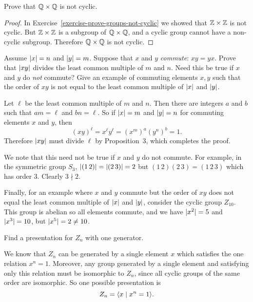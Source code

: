  Prove that $\mathbb{Q}\times\mathbb{Q}$ is not cyclic.
\begin{proof}
  In Exercise~\ref{exercise-prove-groups-not-cyclic} we showed that
  $\mathbb{Z}\times\mathbb{Z}$ is not cyclic. But $\mathbb{Z}\times\mathbb{Z}$ is a subgroup of
  $\mathbb{Q}\times\mathbb{Q}$, and a cyclic group cannot have a non-cyclic
  subgroup. Therefore $\mathbb{Q}\times\mathbb{Q}$ is not cyclic.
\end{proof}

 Assume $\lvert{x}\rvert = n$ and $\lvert{y}\rvert = m$. Suppose that $x$
and $y$ {\em commute}: $xy = yx$. Prove that $\lvert{xy}\rvert$ divides the
least common multiple of $m$ and $n$. Need this be true if $x$ and $y$
do {\em not} commute? Give an example of commuting elements $x,y$ such
that the order of $xy$ is not equal to the least common multiple of
$\lvert{x}\rvert$ and $\lvert{y}\rvert$.
\begin{solution}
  Let $\ell$ be the least common multiple of $m$ and $n$. Then there
  are integers $a$ and $b$ such that $am = \ell$ and $bn = \ell$. So
  if $\lvert{x}\rvert = m$ and $\lvert{y}\rvert = n$ for commuting elements $x$ and
  $y$, then
  \begin{equation*}
    (xy)^\ell = x^\ell y^\ell = (x^m)^a(y^n)^b = 1.
  \end{equation*}
  Therefore $\lvert{xy}\rvert$ must divide $\ell$ by Proposition~3, which
  completes the proof.

  We note that this need not be true if $x$ and $y$ do not
  commute. For example, in the symmetric group $S_3$,
  $\lvert{(1\,2)}\rvert = \lvert{(2\,3)}\rvert = 2$ but $(1\,2)(2\,3) = (1\,2\,3)$
  which has order $3$. Clearly $3\nmid2$.

  Finally, for an example where $x$ and $y$ commute but the order of
  $xy$ does not equal the least common multiple of $\lvert{x}\rvert$ and
  $\lvert{y}\rvert$, consider the cyclic group $Z_{10}$. This group is abelian
  so all elements commute, and we have $\lvert{x^2}\rvert = 5$ and
  $\lvert{x^3}\rvert = 10$, but $\lvert{x^5}\rvert = 2 \neq 10$.
\end{solution}

 Find a presentation for $Z_n$ with one generator.
\begin{solution}
  We know that $Z_n$ can be generated by a single element $x$ which
  satisfies the one relation $x^n = 1$. Moreover, any group generated
  by a single element and satisfying only this relation must be
  isomorphic to $Z_n$, since all cyclic groups of the same order are
  isomorphic. So one possible presentation is
  \begin{equation*}
    Z_n = \langle{x\mid x^n = 1}\rangle.\qedhere
  \end{equation*}
\end{solution}


